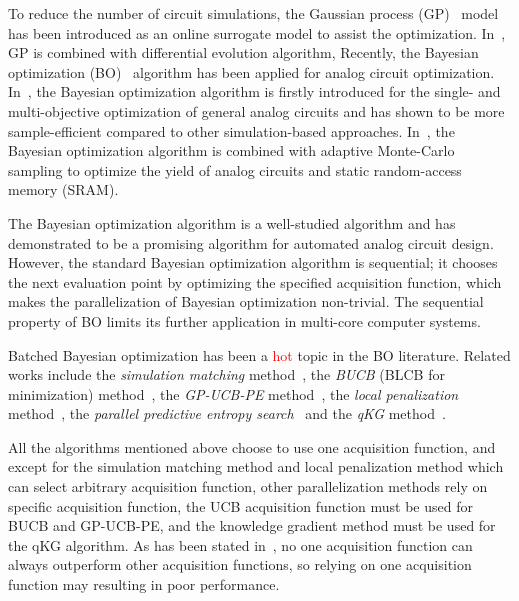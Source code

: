 %
To reduce the number of circuit simulations, the Gaussian process
(GP)~\cite{GPML} model has been introduced as an online surrogate model to
assist the optimization. In~\cite{liu2014gaspad}, GP is combined with
differential evolution algorithm, Recently, the
Bayesian optimization (BO)~\cite{shahriari2016taking} algorithm has been
applied for analog circuit optimization. In~\cite{lyu2017efficient}, the Bayesian optimization algorithm is
firstly introduced for the single- and multi-objective optimization of general analog circuits and has
shown to be more sample-efficient compared to other simulation-based
approaches. In~\cite{wang2017efficient}, the Bayesian optimization algorithm
is combined with adaptive Monte-Carlo sampling to optimize the yield of analog
circuits and static random-access memory (SRAM).

The Bayesian optimization algorithm is a well-studied algorithm and has
demonstrated to be a promising algorithm for automated analog circuit design.
However, the standard Bayesian optimization algorithm is sequential; it chooses
the next evaluation point by optimizing the specified acquisition function,
which makes the parallelization of Bayesian optimization non-trivial. The
sequential property of BO limits its further application in multi-core computer
systems.

Batched Bayesian optimization has been a \textcolor{red}{hot} topic in the BO
literature. Related works include the \emph{simulation matching}
method~\cite{azimi2010batch}, the \emph{BUCB} (BLCB for minimization)
method~\cite{desautels2014parallelizing}, the \emph{GP-UCB-PE}
method~\cite{contal2013parallel}, the \emph{local penalization}
method~\cite{gonzalez2016batch}, the \emph{parallel predictive entropy
search}~\cite{shah2015parallel} and the \emph{qKG}
method~\cite{wu2016parallel}.


All the algorithms mentioned above choose to use one acquisition function, and
except for the simulation matching method and local penalization method which
can select arbitrary acquisition function, other parallelization methods rely
on specific acquisition function, the UCB acquisition function must be used for
BUCB and GP-UCB-PE, and the knowledge gradient method must be used for the qKG
algorithm. As has been stated in~\cite{hoffman2011portfolio}, no one
acquisition function can always outperform other acquisition functions, so
relying on one acquisition function may resulting in poor performance. 

